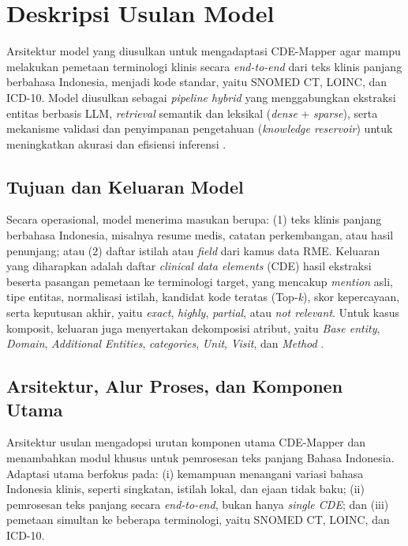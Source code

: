 \section{Deskripsi Usulan Model}

Arsitektur model yang diusulkan untuk mengadaptasi CDE-Mapper agar mampu melakukan pemetaan terminologi klinis secara \textit{end-to-end} dari teks klinis panjang berbahasa Indonesia, menjadi kode standar, yaitu SNOMED CT, LOINC, dan ICD-10. Model diusulkan sebagai \textit{pipeline hybrid} yang menggabungkan ekstraksi entitas berbasis LLM, \textit{retrieval} semantik dan leksikal (\textit{dense} + \textit{sparse}), serta mekanisme validasi dan penyimpanan pengetahuan (\textit{knowledge reservoir}) untuk meningkatkan akurasi dan efisiensi inferensi \citep{gilani_cde-mapper_2025}.

\subsection{Tujuan dan Keluaran Model}

Secara operasional, model menerima masukan berupa: (1) teks klinis panjang berbahasa Indonesia, misalnya resume medis, catatan perkembangan, atau hasil penunjang; atau (2) daftar istilah atau \textit{field} dari kamus data RME. Keluaran yang diharapkan adalah daftar \textit{clinical data elements} (CDE) hasil ekstraksi beserta pasangan pemetaan ke terminologi target, yang mencakup \textit{mention} asli, tipe entitas, normalisasi istilah, kandidat kode teratas (Top-\textit{k}), skor kepercayaan, serta keputusan akhir, yaitu \textit{exact}, \textit{highly}, \textit{partial}, atau \textit{not relevant}. Untuk kasus komposit, keluaran juga menyertakan dekomposisi atribut, yaitu \textit{Base entity}, \textit{Domain}, \textit{Additional Entities}, \textit{categories}, \textit{Unit}, \textit{Visit}, dan \textit{Method} \citep{gilani_cde-mapper_2025}.


\subsection{Arsitektur, Alur Proses, dan Komponen Utama}

Arsitektur usulan mengadopsi urutan komponen utama CDE-Mapper \citep{gilani_cde-mapper_2025} dan menambahkan modul khusus untuk pemrosesan teks panjang Bahasa Indonesia. Adaptasi utama berfokus pada: (i) kemampuan menangani variasi bahasa Indonesia klinis, seperti singkatan, istilah lokal, dan ejaan tidak baku; (ii) pemrosesan teks panjang secara \textit{end-to-end}, bukan hanya \textit{single CDE}; dan (iii) pemetaan simultan ke beberapa terminologi, yaitu SNOMED CT, LOINC, dan ICD-10.

